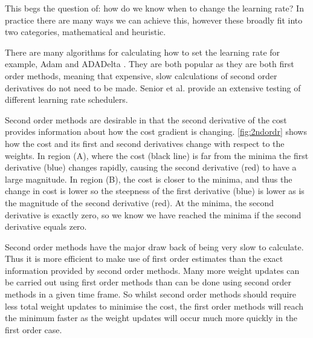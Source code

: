 This begs the question of: how do we know when to change the learning rate? In  practice there are many ways we can achieve this, however these broadly fit into two categories, mathematical and heuristic.

There are many algorithms for calculating how to set the learning rate for example, Adam \cite{kingma2014adam} and ADADelta \cite{zeiler2012adadelta}. They are both popular as they are both first order methods, meaning that expensive, slow calculations of second order derivatives do not need to be made.
Senior et al.\cite{senior2013empirical} provide an extensive testing of different learning rate schedulers. 

Second order methods are desirable in that the second derivative of the cost provides information about how the cost gradient is changing. \autoref{fig:2ndordr} shows how the cost and its first and second derivatives change with respect to the weights. In region (A), where the cost (black line) is far from the minima the first derivative (blue) changes rapidly, causing the second derivative (red) to have a large magnitude. In region (B), the cost is closer to the minima, and thus the change in cost is lower so the steepness of the first derivative (blue) is lower as is the magnitude of the second derivative (red). At the minima, the second derivative is exactly zero, so we know we have reached the minima if the second derivative equals zero.

Second order methods have the major draw back of being very slow to calculate. Thus it is more efficient to make use of first order estimates than the exact information provided by second order methods. Many more weight updates can be carried out using first order methods than can be done using second order methods in a given time frame. So whilst second order methods should require less total weight updates to minimise the cost, the first order methods will reach the minimum faster as the weight updates will occur much more quickly in the first order case.



